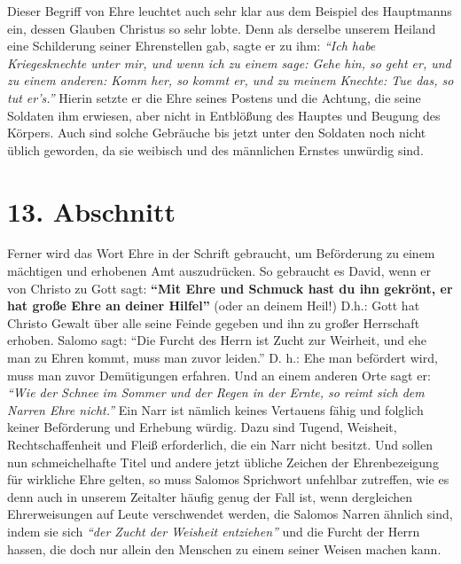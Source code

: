 Dieser Begriff von Ehre leuchtet auch sehr klar aus dem Beispiel des
Hauptmanns ein, dessen Glauben Christus so sehr lobte. Denn als derselbe unserem
Heiland eine Schilderung seiner Ehrenstellen
 gab, sagte er zu ihm:
\textit{"`Ich habe
Kriegesknechte unter mir, und wenn ich zu einem sage: Gehe hin, so geht er, und
zu einem anderen: Komm her, so kommt er, und zu meinem Knechte: Tue das, so tut
er’s."'}
Hierin setzte er die Ehre seines Postens und die
Achtung, die seine Soldaten ihm erwiesen, aber nicht
in
Entblößung des Hauptes
und Beugung des Körpers. Auch sind solche Gebräuche bis jetzt unter den Soldaten
noch nicht üblich geworden, da sie weibisch und des männlichen
Ernstes unwürdig
sind.

\section{13. Abschnitt} \label{kap9_ab13}

Ferner wird das Wort Ehre in der Schrift gebraucht, um Beförderung zu einem
mächtigen und erhobenen Amt auszudrücken. So gebraucht es
David, wenn er von
Christo zu Gott sagt:
\textbf{"`Mit Ehre und Schmuck hast du ihn gekrönt, er hat große
Ehre an deiner Hilfel"'}
(oder an deinem Heil!) D.h.: Gott hat Christo Gewalt über alle seine Feinde
gegeben und ihn zu großer
Herrschaft erhoben. Salomo sagt:
"`Die Furcht des Herrn ist Zucht zur Weirheit,
und ehe man zu Ehren kommt, muss man zuvor leiden."'
D. h.: Ehe man befördert wird, muss man zuvor Demütigungen
erfahren. Und an
einem anderen Orte sagt er:
\textit{"`Wie der Schnee im Sommer und der Regen in der
Ernte, so reimt sich dem Narren Ehre nicht."'}
Ein Narr ist
nämlich keines Vertauens fähig und folglich keiner Beförderung und Erhebung
würdig. Dazu sind Tugend, Weisheit, Rechtschaffenheit und Fleiß erforderlich,
die ein Narr nicht besitzt. Und sollen nun schmeichelhafte Titel und andere
jetzt übliche Zeichen der Ehrenbezeigung für wirkliche Ehre gelten, so muss
Salomos Sprichwort unfehlbar zutreffen, wie es denn auch in unserem Zeitalter
häufig genug der Fall ist, wenn dergleichen Ehrerweisungen auf Leute
verschwendet werden, die Salomos Narren ähnlich sind, indem sie sich
\textit{"`der Zucht der Weisheit entziehen"'}
und die Furcht der
Herrn hassen, die doch nur allein den Menschen zu einem seiner Weisen machen
kann.

